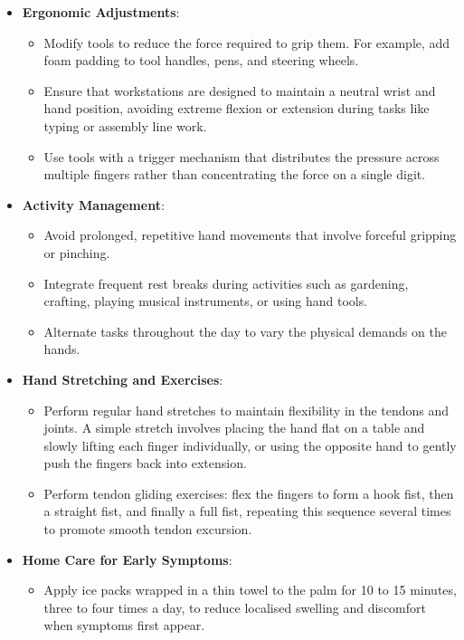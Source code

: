 \begin{itemize}
  \item \textbf{Ergonomic Adjustments}:
  \begin{itemize}
    \item Modify tools to reduce the force required to grip them. For example, add foam padding to tool handles, pens, and steering wheels.
    \item Ensure that workstations are designed to maintain a neutral wrist and hand position, avoiding extreme flexion or extension during tasks like typing or assembly line work.
    \item Use tools with a trigger mechanism that distributes the pressure across multiple fingers rather than concentrating the force on a single digit.
  \end{itemize}
  \item \textbf{Activity Management}:
  \begin{itemize}
    \item Avoid prolonged, repetitive hand movements that involve forceful gripping or pinching.
    \item Integrate frequent rest breaks during activities such as gardening, crafting, playing musical instruments, or using hand tools.
    \item Alternate tasks throughout the day to vary the physical demands on the hands.
  \end{itemize}
  \item \textbf{Hand Stretching and Exercises}:
  \begin{itemize}
    \item Perform regular hand stretches to maintain flexibility in the tendons and joints. A simple stretch involves placing the hand flat on a table and slowly lifting each finger individually, or using the opposite hand to gently push the fingers back into extension.
    \item Perform tendon gliding exercises: flex the fingers to form a hook fist, then a straight fist, and finally a full fist, repeating this sequence several times to promote smooth tendon excursion.
  \end{itemize}
  \item \textbf{Home Care for Early Symptoms}:
  \begin{itemize}
    \item Apply ice packs wrapped in a thin towel to the palm for 10 to 15 minutes, three to four times a day, to reduce localised swelling and discomfort when symptoms first appear.

\end{itemize}
\end{itemize}
